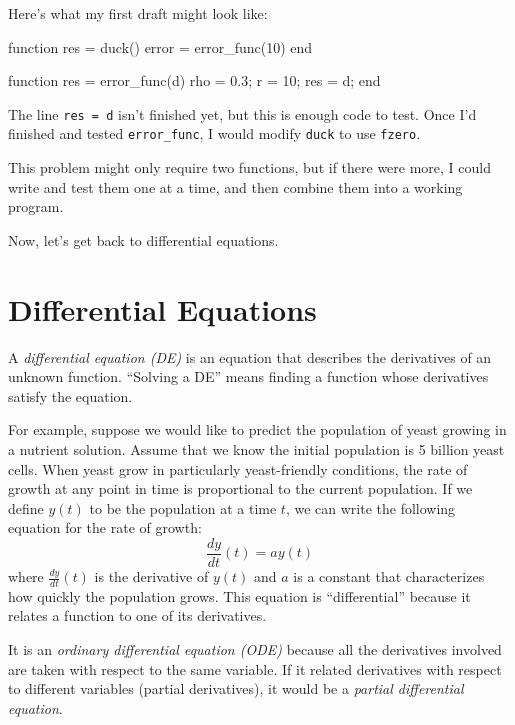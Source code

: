 Here's what my first draft might look like:

\begin{code}
function res = duck()
    error = error_func(10)
end

function res = error_func(d)
    rho = 0.3;      %
    r = 10;         %
    res = d;
end
\end{code}

The line \lstinline{res = d} isn't finished yet, but this
is enough code to test.
Once I'd finished and tested \lstinline{error_func}, I would modify
\lstinline{duck} to use \lstinline{fzero}.

This problem might only require two functions, but if there
were more, I could write and test them one at a time, and then
combine them into a working program.

Now, let's get back to differential equations.


\section{Differential Equations}
\label{diffeq}

A \emph{differential equation (DE)} is an equation that describes the
derivatives of an unknown function.  ``Solving a DE'' means finding a
function whose derivatives satisfy the equation.


For example, suppose we would like to predict the population of yeast growing in a nutrient solution.  Assume that we know the initial population is 5 billion yeast cells.
When yeast grow in particularly yeast-friendly
conditions, the rate of growth at any point in time is proportional to the current population.  If we define $y(t)$ to be the population at a time $t$, we can write the following equation for the rate of growth:
%
\begin{equation*}
\frac{dy}{dt}(t) = a y(t)
\end{equation*}
%
where $\frac{dy}{dt}(t)$ is the derivative of $y(t)$ and
$a$ is a constant that characterizes how quickly the population
grows.
This equation is ``differential'' because it relates a function to one of its derivatives.


It is an \emph{ordinary differential equation (ODE)} because all the
derivatives involved are taken with respect to the
same variable.
If it related derivatives with respect to
different variables (partial derivatives), it would be a \emph{partial
differential equation}.

